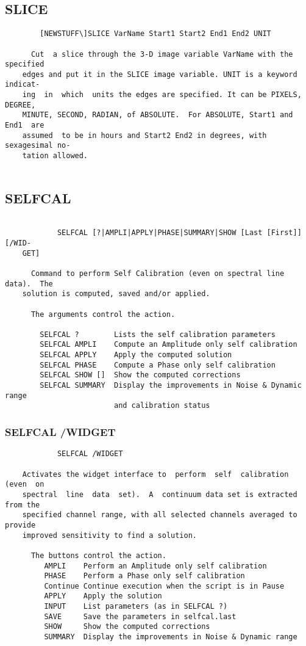 \subsection{SLICE}
\begin{verbatim}
        [NEWSTUFF\]SLICE VarName Start1 Start2 End1 End2 UNIT

      Cut  a slice through the 3-D image variable VarName with the specified
    edges and put it in the SLICE image variable. UNIT is a keyword indicat-
    ing  in  which  units the edges are specified. It can be PIXELS, DEGREE,
    MINUTE, SECOND, RADIAN, of ABSOLUTE.  For ABSOLUTE, Start1 and End1  are
    assumed  to be in hours and Start2 End2 in degrees, with sexagesimal no-
    tation allowed.


\end{verbatim}
\subsection{SELFCAL}
\begin{verbatim}

            SELFCAL [?|AMPLI|APPLY|PHASE|SUMMARY|SHOW [Last [First]]  [/WID-
    GET]

      Command to perform Self Calibration (even on spectral line data).  The
    solution is computed, saved and/or applied.

      The arguments control the action.

        SELFCAL ?        Lists the self calibration parameters
        SELFCAL AMPLI    Compute an Amplitude only self calibration
        SELFCAL APPLY    Apply the computed solution
        SELFCAL PHASE    Compute a Phase only self calibration
        SELFCAL SHOW []  Show the computed corrections
        SELFCAL SUMMARY  Display the improvements in Noise & Dynamic range
                         and calibration status
\end{verbatim}
\subsubsection{SELFCAL /WIDGET}
\begin{verbatim}
            SELFCAL /WIDGET

    Activates the widget interface to  perform  self  calibration  (even  on
    spectral  line  data  set).  A  continuum data set is extracted from the
    specified channel range, with all selected channels averaged to  provide
    improved sensitivity to find a solution.

      The buttons control the action.
         AMPLI    Perform an Amplitude only self calibration
         PHASE    Perform a Phase only self calibration
         Continue Continue execution when the script is in Pause
         APPLY    Apply the solution
         INPUT    List parameters (as in SELFCAL ?)
         SAVE     Save the parameters in selfcal.last
         SHOW     Show the computed corrections
         SUMMARY  Display the improvements in Noise & Dynamic range
\end{verbatim}
